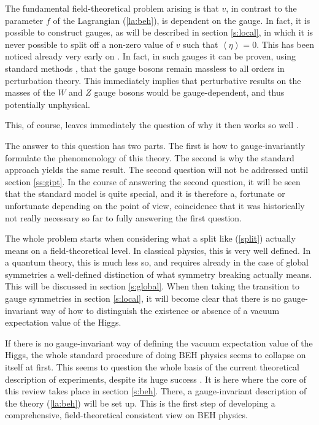 \documentclass[final,12pt,3p,longtitle]{elsarticle}
\newcommand*{\pref}[1]{(\ref{#1})}
\newcommand*{\1}{1\!\!\!\bot}
\newcommand*{\la}{\left\langle}
\newcommand*{\ra}{\right\rangle}
\begin{document}
The fundamental field-theoretical problem arising is that $v$, in contrast to the parameter $f$ of the Lagrangian \pref{la:beh}, is dependent on the gauge. In fact, it is possible to construct gauges, as will be described in section \ref{s:local}, in which it is never possible to split off a non-zero value of $v$ such that $\la\eta\ra=0$. This has been noticed already very early on \cite{Lee:1974zg}. In fact, in such gauges it can be proven, using standard methods \cite{Bohm:2001yx}, that the gauge bosons remain massless to all orders in perturbation theory. This immediately implies that perturbative results on the masses of the $W$ and $Z$ gauge bosons would be gauge-dependent, and thus potentially unphysical.

This, of course, leaves immediately the question of why it then works so well \cite{pdg}.

The answer to this question has two parts. The first is how to gauge-invariantly formulate the phenomenology of this theory. The second is why the standard approach yields the same result. The second question will not be addressed until section \ref{ss:gipt}. In the course of answering the second question, it will be seen that the standard model is quite special, and it is therefore a, fortunate or unfortunate depending on the point of view, coincidence that it was historically not really necessary so far to fully answering the first question.

The whole problem starts when considering what a split like \pref{split} actually means on a field-theoretical level. In classical physics, this is very well defined. In a quantum theory, this is much less so, and requires already in the case of global symmetries a well-defined distinction of what symmetry breaking actually means. This will be discussed in section \ref{s:global}. When then taking the transition to gauge symmetries in section \ref{s:local}, it will become clear that there is no gauge-invariant way of how to distinguish the existence or absence of a vacuum expectation value of the Higgs.

If there is no gauge-invariant way of defining the vacuum expectation value of the Higgs, the whole standard procedure \cite{Bohm:2001yx} of doing BEH physics seems to collapse on itself at first. This seems to question the whole basis of the current theoretical description of experiments, despite its huge success \cite{pdg}. It is here where the core of this review takes place in section \ref{s:beh}. There, a gauge-invariant description of the theory \pref{la:beh} will be set up. This is the first step of developing a comprehensive, field-theoretical consistent view on BEH physics.
\end{document}
